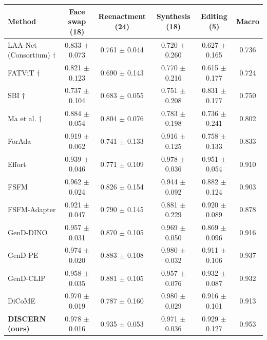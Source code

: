 \begin{tabular}{lccccc}
\toprule
Method & Face swap (18) & Reenactment (24) & Synthesis (18) & Editing (5) & Macro \\
\midrule
LAA-Net (Consortium) $\dagger$ & 0.833 $\pm$ 0.073 & 0.761 $\pm$ 0.044 & 0.720 $\pm$ 0.260 & 0.627 $\pm$ 0.165 & 0.736 \\
FATViT $\dagger$ & 0.821 $\pm$ 0.123 & 0.690 $\pm$ 0.143 & 0.770 $\pm$ 0.216 & 0.615 $\pm$ 0.177 & 0.724 \\
SBI $\dagger$ & 0.737 $\pm$ 0.104 & 0.683 $\pm$ 0.055 & 0.751 $\pm$ 0.208 & 0.831 $\pm$ 0.177 & 0.750 \\
Ma et al. $\dagger$ & 0.884 $\pm$ 0.054 & 0.804 $\pm$ 0.076 & 0.783 $\pm$ 0.198 & 0.736 $\pm$ 0.241 & 0.802 \\
\midrule
ForAda & 0.919 $\pm$ 0.062 & 0.741 $\pm$ 0.133 & 0.916 $\pm$ 0.125 & 0.758 $\pm$ 0.133 & 0.833 \\
Effort & 0.939 $\pm$ 0.046 & 0.771 $\pm$ 0.109 & 0.978 $\pm$ 0.036 & 0.951 $\pm$ 0.054 & 0.910 \\
FSFM & 0.962 $\pm$ 0.024 & 0.826 $\pm$ 0.154 & 0.944 $\pm$ 0.092 & 0.882 $\pm$ 0.124 & 0.903 \\
FSFM-Adapter & 0.921 $\pm$ 0.047 & 0.790 $\pm$ 0.145 & 0.881 $\pm$ 0.229 & 0.920 $\pm$ 0.089 & 0.878 \\
GenD-DINO & 0.957 $\pm$ 0.031 & 0.870 $\pm$ 0.105 & 0.969 $\pm$ 0.050 & 0.869 $\pm$ 0.096 & 0.916 \\
GenD-PE & 0.974 $\pm$ 0.020 & 0.883 $\pm$ 0.108 & 0.980 $\pm$ 0.032 & 0.911 $\pm$ 0.106 & 0.937 \\
GenD-CLIP & 0.958 $\pm$ 0.035 & 0.881 $\pm$ 0.105 & 0.957 $\pm$ 0.076 & 0.932 $\pm$ 0.087 & 0.932 \\
DiCoME & 0.970 $\pm$ 0.019 & 0.787 $\pm$ 0.160 & 0.980 $\pm$ 0.029 & 0.916 $\pm$ 0.101 & 0.913 \\
\textbf{DISCERN (ours)} & 0.978 $\pm$ 0.016 & 0.935 $\pm$ 0.053 & 0.971 $\pm$ 0.036 & 0.929 $\pm$ 0.127 & 0.953 \\
\bottomrule
\end{tabular}
